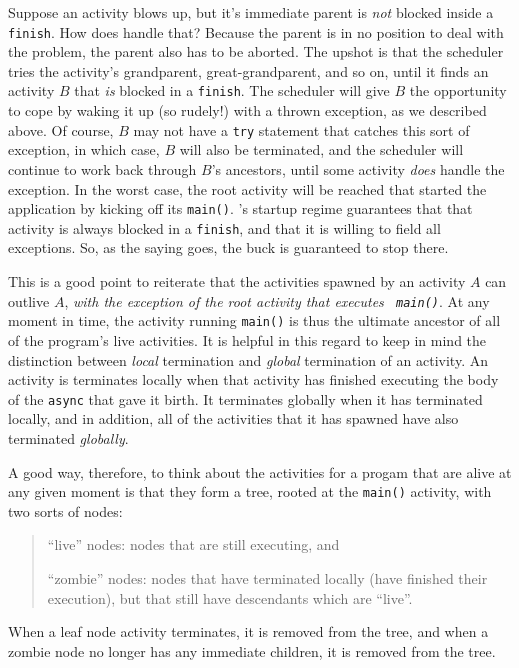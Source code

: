 Suppose an activity blows up, but it's immediate parent is {\em not} blocked
inside a {\tt finish}.  How does \Xten{} handle that?  Because the parent is in
no position to deal with the problem, the parent also has to be aborted.  The
upshot is that the scheduler tries the activity's grandparent, great-grandparent,
and so on, until it finds an activity $B$ that {\em is} blocked in a {\tt finish}.
The scheduler will give $B$ the opportunity to cope by waking it up
(so rudely!) with a thrown exception, as we described above.  
Of course, $B$ may not have a {\tt try} statement that catches this sort of
exception, in which case, $B$ will also be terminated, and the scheduler will
continue to work back through $B$'s ancestors, until some activity {\em does} handle the
exception.  In the worst case, the root activity will be reached that started
the application by kicking off its {\tt main()}.  \Xten's startup regime
guarantees that that activity is always blocked in a {\tt finish}, and that it
is willing to field all exceptions.  So, as the saying goes, the buck is
guaranteed to stop there.

This is a good point to reiterate that the activities spawned by an activity $A$
can outlive $A$, {\em with the exception of the root activity that executes {\tt
main()}}.  At any moment in time, the activity running {\tt main()} is thus the
ultimate ancestor of all of the program's live activities. It is helpful in this
regard to keep in mind the distinction between {\em local} termination and {\em
global} termination of an activity. An activity is terminates locally when that
activity has finished executing the body of the {\tt async} that gave it birth. 
It terminates globally when it has terminated locally, and in addition, all of
the activities that it has spawned have also terminated {\em globally}.

A good way, therefore, to think about the activities for a progam that are alive
at any given moment is that they form a tree, rooted at the {\tt main()}
activity, with two sorts of nodes:

\begin{quote}
``live'' nodes: nodes that are still executing, and

``zombie'' nodes: nodes that have terminated locally (\ie have finished their
execution), but that still have descendants which are ``live''. 
\end{quote}

When a leaf node activity terminates, it is removed from the
tree, and when a zombie node no longer has any immediate children, it is
removed from the tree.

